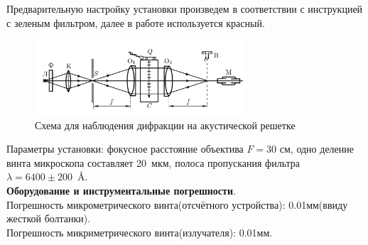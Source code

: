 \documentclass[a4paper,12pt]{article}
\begin{document}
    Предварительную настройку установки произведем в соответствии с инструкцией с зеленым фильтром, далее в работе используется красный.
    
    	\begin{figure}[h!]
    	\centering	
    	\includegraphics[width=0.7\textwidth]{shema1.png}
    	\caption{Схема для наблюдения дифракции на акустической решетке}
    	\label{shema1}
    \end{figure}
    
    Параметры установки: фокусное расстояние объектива $F = 30 $ см, одно деление винта микроскопа составляет 20~мкм, полоса пропускания фильтра \mbox{$\lambda = 6400\pm 200$ Å}.\\
    \textbf{Оборудование и инструментальные погрешности}.\\
    Погрешность микрометрического винта(отсчётного устройства): 0.01мм(ввиду жесткой болтанки).\\
    Погрешность микриметрического винта(излучателя): 0.01мм.
\end{document}
